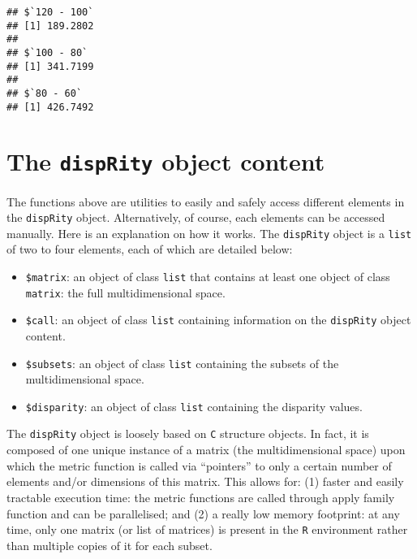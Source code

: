 \documentclass[
]{book}
\newenvironment{Shaded}{\begin{snugshade}}{\end{snugshade}}
\newcommand{\CommentTok}[1]{\textcolor[rgb]{0.56,0.35,0.01}{\textit{#1}}}
\newcommand{\ControlFlowTok}[1]{\textcolor[rgb]{0.13,0.29,0.53}{\textbf{#1}}}
\newcommand{\KeywordTok}[1]{\textcolor[rgb]{0.13,0.29,0.53}{\textbf{#1}}}
\newcommand{\NormalTok}[1]{#1}
\newcommand{\OperatorTok}[1]{\textcolor[rgb]{0.81,0.36,0.00}{\textbf{#1}}}
\providecommand{\tightlist}{%
  \setlength{\itemsep}{0pt}\setlength{\parskip}{0pt}}
\begin{document}
\begin{Shaded}
\end{Shaded}

\begin{verbatim}
## $`120 - 100`
## [1] 189.2802
## 
## $`100 - 80`
## [1] 341.7199
## 
## $`80 - 60`
## [1] 426.7492
\end{verbatim}

\hypertarget{disprity-object}{%
\section{\texorpdfstring{The \texttt{dispRity} object content}{The dispRity object content}}\label{disprity-object}}

The functions above are utilities to easily and safely access different elements in the \texttt{dispRity} object.
Alternatively, of course, each elements can be accessed manually.
Here is an explanation on how it works.
The \texttt{dispRity} object is a \texttt{list} of two to four elements, each of which are detailed below:

\begin{itemize}
\tightlist
\item
  \texttt{\$matrix}: an object of class \texttt{list} that contains at least one object of class \texttt{matrix}: the full multidimensional space.
\item
  \texttt{\$call}: an object of class \texttt{list} containing information on the \texttt{dispRity} object content.
\item
  \texttt{\$subsets}: an object of class \texttt{list} containing the subsets of the multidimensional space.
\item
  \texttt{\$disparity}: an object of class \texttt{list} containing the disparity values.
\end{itemize}

The \texttt{dispRity} object is loosely based on \texttt{C} structure objects.
In fact, it is composed of one unique instance of a matrix (the multidimensional space) upon which the metric function is called via ``pointers'' to only a certain number of elements and/or dimensions of this matrix.
This allows for: (1) faster and easily tractable execution time: the metric functions are called through apply family function and can be parallelised; and (2) a really low memory footprint: at any time, only one matrix (or list of matrices) is present in the \texttt{R} environment rather than multiple copies of it for each subset.
\end{document}
